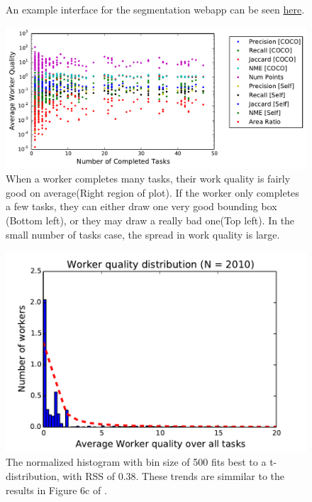 \documentclass[12pt]{article}
\begin{document}
\begin{appendices}
\begin{figure}[ht!]
\caption{An example interface for the segmentation webapp can be seen  \href{http://crowd-segment.herokuapp.com/segment/COCO_train2014_000000000127/10/}{here}.}
\label{interface}
\end{figure}
\begin{figure}[ht]
\centering
\includegraphics[width=0.9\linewidth]{plots/quality_vs_quantity.pdf}
\caption{ When a worker completes many tasks, their work quality is fairly good on average(Right region of plot). If the worker only completes a few tasks, they can either draw one very good bounding box (Bottom left), or they may draw a really bad one(Top left). In the small number of tasks case, the spread in work quality is large. }
\label{qvsqplot}
\end{figure}

\begin{figure}[ht!]
\centering
\includegraphics[width=0.8\linewidth]{plots/Wqual_dist.pdf}
\caption{The normalized histogram with bin size of 500 fits best to a t-distribution, with RSS of 0.38. These trends are simmilar to the results in Figure 6c of \cite{OCWelinder2010}.}
\label{Wqual}
\end{figure}


\end{appendices}
\end{document}
